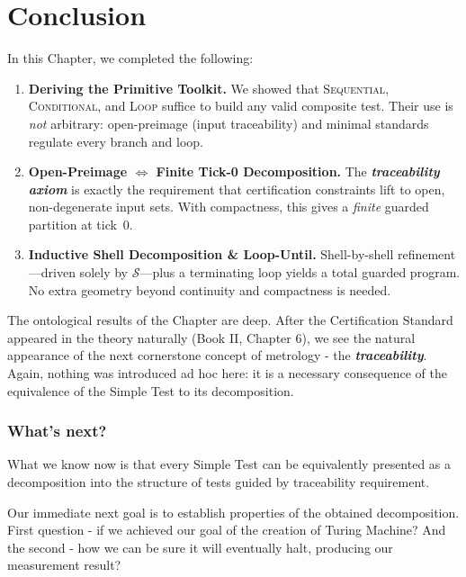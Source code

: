 \documentclass[12pt]{article}
\theoremstyle{definition}
\theoremstyle{plain}
\begin{document}
\section{Conclusion}
In this Chapter, we completed the following:

\begin{enumerate}
    \item \textbf{Deriving the Primitive Toolkit.}  
        We showed that \textsc{Sequential}, \textsc{Conditional}, and \textsc{Loop} suffice to build any valid composite test.  Their use is \emph{not} arbitrary: open-preimage (input traceability) and minimal standards regulate every branch and loop.
  \item \textbf{Open-Preimage $\Longleftrightarrow$ Finite Tick-0 Decomposition.}  
        The \textbf{\textit{traceability axiom}} is exactly the requirement that certification constraints lift to open, non-degenerate input sets.  With compactness, this gives a \emph{finite} guarded partition at tick~0.
  \item \textbf{Inductive Shell Decomposition \& Loop-Until.}  
        Shell-by-shell refinement—driven solely by $\mathcal S$—plus a terminating loop yields a total guarded program.  No extra geometry beyond continuity and compactness is needed.
\end{enumerate}

The ontological results of the Chapter are deep. After the Certification Standard appeared in the theory naturally (Book II, Chapter 6), we see the natural appearance of the next cornerstone concept of metrology - the \textbf{\textit{traceability}}. Again, nothing was introduced ad hoc here: it is a necessary consequence of the equivalence of the Simple Test to its decomposition.

\subsubsection{What's next?}
What we know now is that every Simple Test can be equivalently presented as a decomposition into the structure of tests guided by traceability requirement.

Our immediate next goal is to establish properties of the obtained decomposition. First question - if we achieved our goal of the creation of Turing Machine? And the second - how we can be sure it will eventually halt, producing our measurement result?
\end{document}
